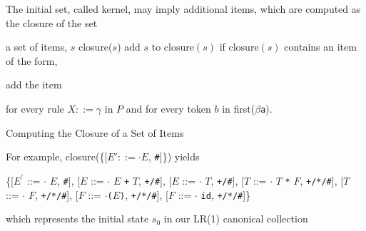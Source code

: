 \documentclass[8pt,a4paper,compress]{beamer}
\newcommand{\mm}[1]{$#1$}
\newcommand{\expo}[2]{$#1^{#2}$}
\newenvironment{spaced}
{
\smallskip
\hspace{.5cm}
\begin{minipage}[c]{\textwidth}
}
{
\end{minipage}
\smallskip
}
\begin{document}
\begin{frame}[fragile]
\pause

The initial set, called kernel, may imply additional items, which are computed as the closure of the set

\pause
\bigskip

\begin{algorithm}[H]
\begin{algorithmic}
\REQUIRE a set of items, $s$
\ENSURE closure($s$)
\STATE add $s$ to $\text{closure}(s)$
\REPEAT
\STATE if $\text{closure}(s)$ contains an item of the form,

\begin{production}
[\mm{Y} ::= \mm{\alpha \cdot} \mm{X} \mm{\beta}, \lstinline{a}]
\end{production}

\noindent add the item

\begin{production}
[\mm{X} ::= \mm{\cdot \gamma}, \lstinline{b}]
\end{production}

\noindent for every rule $X ::= \gamma$ in $P$ and for every token $b$ in first($\beta$\lstinline{a}).
\end{algorithmic}
\caption{Computing the Closure of a Set of Items}
\end{algorithm}
\end{frame}

\begin{frame}[fragile]
\pause

For example, closure(\{[$E' ::= \cdot E$, \lstinline{#}]\}) yields

\text{ }
\begin{spaced}
\begin{production}
\{[\expo{E}{\prime} ::= \mm{\cdot} \mm{E}, \lstinline{#}],
  [\mm{E}  ::= \mm{\cdot} \mm{E} \lstinline{+} \mm{T}, \lstinline{+/#}],
  [\mm{E}  ::= \mm{\cdot} \mm{T}, \lstinline{+/#}],
  [\mm{T}  ::= \mm{\cdot} \mm{T} \lstinline{*} \mm{F}, \lstinline{+/*/#}],
  [\mm{T}  ::= \mm{\cdot} \mm{F}, \lstinline{+/*/#}],
  [\mm{F}  ::= \mm{\cdot}\lstinline{(}\mm{E}\lstinline{)}, \lstinline{+/*/#}],
  [\mm{F}  ::= \mm{\cdot} \lstinline{id}, \lstinline{+/*/#}]\}
\end{production}
\end{spaced}

\noindent which represents the initial state $s_0$ in our LR(1) canonical collection
\end{frame}
\end{document}

